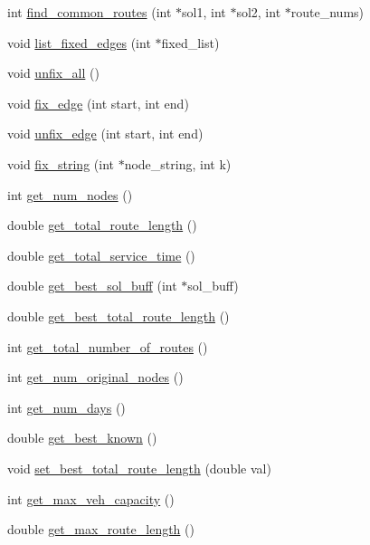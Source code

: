 \begin{DoxyCompactItemize}
int \hyperlink{class_v_r_p_af5ff0b40d59ae77de3717e5a8be19828}{find\_\-common\_\-routes} (int $\ast$sol1, int $\ast$sol2, int $\ast$route\_\-nums)
\item 
void \hyperlink{class_v_r_p_a7ef75affd632e4493c1c2c2ed14c2ecd}{list\_\-fixed\_\-edges} (int $\ast$fixed\_\-list)
\item 
void \hyperlink{class_v_r_p_ae71ef1c9462cf6d175d20abb357e8c31}{unfix\_\-all} ()
\item 
void \hyperlink{class_v_r_p_a5dd07c6c3a29a8ac0d1f149bef9eb433}{fix\_\-edge} (int start, int end)
\item 
void \hyperlink{class_v_r_p_a1f927132c4d90c5a6aa793a3cbfeb5f5}{unfix\_\-edge} (int start, int end)
\item 
void \hyperlink{class_v_r_p_a8ea26e9e50f8e5064097d68f12f53e94}{fix\_\-string} (int $\ast$node\_\-string, int k)
\item 
int \hyperlink{class_v_r_p_a28d56748005cb291e0299acfa7a72346}{get\_\-num\_\-nodes} ()
\item 
double \hyperlink{class_v_r_p_a2197b98f43f825d1af6c74bed717b3b4}{get\_\-total\_\-route\_\-length} ()
\item 
double \hyperlink{class_v_r_p_a78e8995a693b0619a9c4e1ec6150f4f3}{get\_\-total\_\-service\_\-time} ()
\item 
double \hyperlink{class_v_r_p_abe6b9554fab15788c1159937aac8f7ab}{get\_\-best\_\-sol\_\-buff} (int $\ast$sol\_\-buff)
\item 
double \hyperlink{class_v_r_p_a3f7a41c3d1f896909a0cc83004a55993}{get\_\-best\_\-total\_\-route\_\-length} ()
\item 
int \hyperlink{class_v_r_p_a50f7c69b6795b89895c1b3a0fd267ea3}{get\_\-total\_\-number\_\-of\_\-routes} ()
\item 
int \hyperlink{class_v_r_p_a2e165fe21cf793a8f58efb039ebf36f5}{get\_\-num\_\-original\_\-nodes} ()
\item 
int \hyperlink{class_v_r_p_a0080e91ea13bffc3f372c60fc2f2444a}{get\_\-num\_\-days} ()
\item 
double \hyperlink{class_v_r_p_aa0ac9587aa6a5282550fbdf32fcfeb11}{get\_\-best\_\-known} ()
\item 
void \hyperlink{class_v_r_p_a88f8ccc266e829d431e726c2e8b81caa}{set\_\-best\_\-total\_\-route\_\-length} (double val)
\item 
int \hyperlink{class_v_r_p_aa001538b0c1fdfdda8f47661e4e98b6e}{get\_\-max\_\-veh\_\-capacity} ()
\item 
double \hyperlink{class_v_r_p_aac110a652caa37ca55af15b8fe732805}{get\_\-max\_\-route\_\-length} ()

\end{DoxyCompactItemize}
